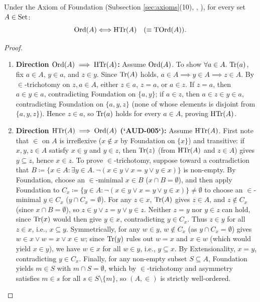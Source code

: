 \documentclass[10pt,a4paper]{article}
\renewcommand{\myprf}{\begin{proof}}
\renewcommand{\myqed}{\end{proof}}
\begin{document}
\begin{theorem}\label{thm:ord_htr_equiv}
Under the Axiom of Foundation (Subsection \ref{sec:axioms}(10), \cite[Ch.~III]{Bernays1958}, \cite[Thm.~7.13]{TakeutiZaring1982}), for every set $A \in {\textrm{Set}}$:
$${\textrm{Ord}}(A) \Longleftrightarrow {\textrm{HTr}}(A) \quad (\equiv {\textrm{TOrd}}(A)).$$
\end{theorem}
\myprf
\begin{enumerate}
\item \textbf{Direction ${\textrm{Ord}}(A) \implies {\textrm{HTr}}(A)$:} Assume ${\textrm{Ord}}(A)$. To show $\forall a \in A.\ {\textrm{Tr}}(a)$, fix $a \in A$, $y \in a$, and $z \in y$. Since ${\textrm{Tr}}(A)$ holds, $a \in A \implies y \in A \implies z \in A$. By $\in$-trichotomy on $z, a \in A$, either $z \in a$, $z = a$, or $a \in z$. If $z = a$, then $a \in y \in a$, contradicting Foundation on $\{a, y\}$; if $a \in z$, then $a \in z \in y \in a$, contradicting Foundation on $\{a, y, z\}$ (none of whose elements is disjoint from $\{a, y, z\}$). Hence $z \in a$, so ${\textrm{Tr}}(a)$ holds for every $a \in A$, proving ${\textrm{HTr}}(A)$.
\item \textbf{Direction ${\textrm{HTr}}(A) \implies {\textrm{Ord}}(A)$ (`AUD-005`):} Assume ${\textrm{HTr}}(A)$. First note that $\in$ on $A$ is irreflexive ($x \notin x$ by Foundation on $\{x\}$) and transitive: if $x, y, z \in A$ satisfy $x \in y$ and $y \in z$, then ${\textrm{Tr}}(z)$ (from ${\textrm{HTr}}(A)$ and $z \in A$) gives $y \subseteq z$, hence $x \in z$. To prove $\in$-trichotomy, suppose toward a contradiction that $B \coloneqq \{x \in A : \exists y \in A.\ \neg(x \in y \lor x = y \lor y \in x)\}$ is non-empty. By Foundation, choose an $\in$-minimal $x \in B$ ($x \cap B = \emptyset$), and then apply Foundation to $C_x \coloneqq \{y \in A : \neg(x \in y \lor x = y \lor y \in x)\} \neq \emptyset$ to choose an $\in$-minimal $y \in C_x$ ($y \cap C_x = \emptyset$). For any $z \in x$, ${\textrm{Tr}}(A)$ gives $z \in A$, and $z \notin C_x$ (since $x \cap B = \emptyset$), so $z \in y \lor z = y \lor y \in z$. Neither $z = y$ nor $y \in z$ can hold, since ${\textrm{Tr}}(x)$ would then give $y \in x$, contradicting $y \in C_x$. Thus $z \in y$ for all $z \in x$, i.e., $x \subseteq y$. Symmetrically, for any $w \in y$, $w \notin C_x$ (as $y \cap C_x = \emptyset$) gives $w \in x \lor w = x \lor x \in w$; since ${\textrm{Tr}}(y)$ rules out $w = x$ and $x \in w$ (which would yield $x \in y$), we have $w \in x$ for all $w \in y$, i.e., $y \subseteq x$. By Extensionality, $x = y$, contradicting $y \in C_x$. Finally, for any non-empty subset $S \subseteq A$, Foundation yields $m \in S$ with $m \cap S = \emptyset$, which by $\in$-trichotomy and asymmetry satisfies $m \in s$ for all $s \in S \setminus \{m\}$, so $(A, \in)$ is strictly well-ordered.
\end{enumerate}
\myqed
\end{document}
